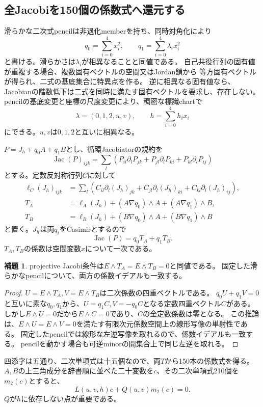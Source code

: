 \documentclass[a4paper,11pt]{ltjsarticle}
\theoremstyle{definition}
\newtheorem{lemma}[theorem]{補題}
\theoremstyle{definition}\newtheorem{definition}[theorem]{定義}
\theoremstyle{remark}\newtheorem{remark}[theorem]{注意}
\newcommand{\Jac}{\operatorname{Jac}}
\begin{document}
\subsection{全Jacobiを150個の係数式へ還元する}
滑らかな二次式pencilは非退化memberを持ち、同時対角化により
\[
q_0=\sum_{i=0}^4x_i^2,\qquad q_1=\sum_{i=0}^4\lambda_ix_i^2
\]
と書ける。滑らかさは$\lambda_i$が相異なることと同値である。
自己共役行列の固有値が重複する場合、複数固有ベクトルの空間又はJordan鎖から
等方固有ベクトルが得られ、二式の基底集合に特異点を作る。
逆に相異なる固有値なら、Jacobianの階数低下は二式を同時に満たす固有ベクトルを要求し、存在しない。
pencilの基底変更と座標の尺度変更により、稠密な標識chartで
\[
\lambda=(0,1,2,u,v),\qquad h=\sum_{i=0}^4h_ix_i
\]
にできる。$u,v$は$0,1,2$と互いに相異なる。

$P=J_h+q_0A+q_1B$とし、循環Jacobiatorの規約を
\[
\Jac(P)_{ijk}=\sum_l(P_{il}\partial_lP_{jk}+P_{jl}\partial_lP_{ki}+P_{kl}\partial_lP_{ij})
\]
とする。定数反対称行列$C$に対して
\[
\begin{split}
\ell_C(J_h)_{ijk}&=\sum_l(C_{il}\partial_l(J_h)_{jk}+
 C_{jl}\partial_l(J_h)_{ki}+C_{kl}\partial_l(J_h)_{ij}),\\
T_A&=\ell_A(J_h)+(A\nabla q_0)\wedge A+(A\nabla q_1)\wedge B,\\
T_B&=\ell_B(J_h)+(B\nabla q_0)\wedge A+(B\nabla q_1)\wedge B
\end{split}
\]
と置く。$J_h$は両$q_i$をCasimirとするので
\begin{equation}
 \Jac(P)=q_0T_A+q_1T_B.                                \label{eq:jac-factor}
\end{equation}
$T_A,T_B$の係数は空間変数$x$について一次である。

\begin{lemma}\label{lem:150}
projective Jacobi条件は$E\wedge T_A=E\wedge T_B=0$と同値である。
固定した滑らかなpencilについて、両方の係数イデアルも一致する。
\end{lemma}
\begin{proof}
$U=E\wedge T_A,V=E\wedge T_B$は二次係数の四重ベクトルである。
$q_0U+q_1V=0$と互いに素な$q_0,q_1$から、$U=q_1C,V=-q_0C$となる定数四重ベクトル$C$がある。
しかし$E\wedge U=0$だから$E\wedge C=0$であり、$C$の全定数係数は零となる。
この推論は、$E\wedge U=E\wedge V=0$を満たす有限次元係数空間上の線形写像の単射性である。
固定したpencilでは線形な左逆写像を取れるので、係数イデアルも一致する。
pencilを動かす場合も可逆minorの開集合上で同じ左逆を取れる。
\end{proof}

四添字は五通り、二次単項式は十五個なので、両$T$から150本の係数式を得る。
$A,B$の上三角成分を辞書順に並べた二十変数を$c$、その二次単項式210個を$m_2(c)$とすると、
\begin{equation}
 L(u,v,h)c+Q(u,v)m_2(c)=0.                            \label{eq:LQ}
\end{equation}
$Q$が$h$に依存しない点が重要である。
\end{document}
